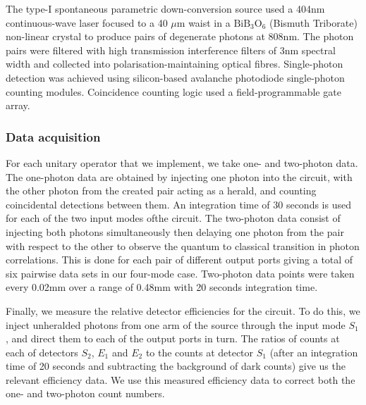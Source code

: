 The type-I spontaneous parametric down-conversion source used a 404nm
continuous-wave laser focused to a 40 \(\mu\)m waist in a \(\text{BiB}_3
\text{O}_6\) (Bismuth Triborate) non-linear crystal to produce pairs of
degenerate photons at 808nm. The photon pairs were filtered with high
transmission interference filters of 3nm spectral width and collected into
polarisation-maintaining optical fibres. Single-photon detection was achieved
using silicon-based avalanche photodiode single-photon counting modules.
Coincidence counting logic used a field-programmable gate array.


\subsubsection{Data acquisition}
For each unitary operator that we implement, we take one- and two-photon data.
The one-photon data are obtained by injecting one photon into the circuit, with
the other photon from the created pair acting as a herald, and counting
coincidental detections between them. An integration time of 30 seconds is used
for each of the two input modes ofthe circuit.
The two-photon data consist of injecting both photons simultaneously then
delaying one photon from the pair with respect to the other to observe the
quantum to classical transition in photon correlations. This is done for each
pair of different output ports giving a total of six pairwise data sets in our
four-mode case. Two-photon data points were taken every 0.02mm over a range of
0.48mm with 20 seconds integration time.

Finally, we measure the relative detector efficiencies for the circuit. To do
this, we inject unheralded photons from one arm of the source through the input
mode \(S_1\), and direct them to each of the output ports in turn. The ratios of
counts at each of detectors \(S_2\), \(E_1\) and \(E_2\) to the counts at
detector \(S_1\) (after an integration time of 20 seconds and subtracting the
background of dark counts) give us the relevant efficiency data. We use this
measured efficiency data to correct both the one- and two-photon count numbers.

